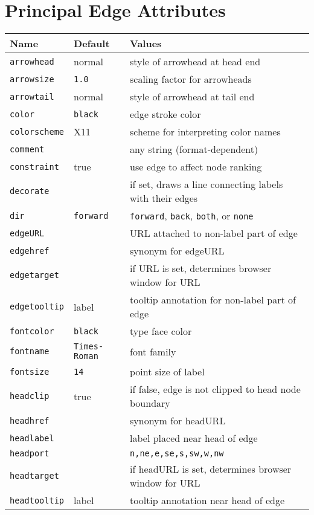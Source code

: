 \documentclass[11pt]{article}
\begin{document}
{\section{Principal Edge Attributes}
\label{sec:edge_attr}
{\footnotesize
\begin{tabular}[t]{|l|l|p{3.5in}|} \hline
Name & Default & Values \\ \hline
{\tt arrowhead} & normal & style of arrowhead at head end \\
{\tt arrowsize} & {\tt 1.0} & scaling factor for arrowheads \\
{\tt arrowtail} & normal & style of arrowhead at tail end \\
{\tt color} & {\tt black} & edge stroke color \\
{\tt colorscheme} & X11 & scheme for interpreting color names \\
{\tt comment} & & any string (format-dependent) \\
{\tt constraint} & true & use edge to affect node ranking \\
{\tt decorate} & & if set, draws a line connecting labels with their edges \\
{\tt dir} & {\tt forward} & {\tt forward}, {\tt back}, {\tt both}, or {\tt none} \\ 
{\tt edgeURL} & & URL attached to non-label part of edge \\
{\tt edgehref} & & synonym for edgeURL \\
{\tt edgetarget} & & if URL is set, determines browser window for URL \\
{\tt edgetooltip} & label & tooltip annotation for non-label part of edge \\
{\tt fontcolor} & {\tt black} & type face color \\
{\tt fontname} & {\tt Times-Roman} & font family \\
{\tt fontsize} & {\tt 14} & point size of label \\
{\tt headclip} & true & if false, edge is not clipped to head node boundary \\
{\tt headhref} & & synonym for headURL \\
{\tt headlabel} & & label placed near head of edge \\
{\tt headport} & & {\tt n,ne,e,se,s,sw,w,nw}\\
{\tt headtarget} & & if headURL is set, determines browser window for URL \\
{\tt headtooltip} & label & tooltip annotation near head of edge \\

\end{tabular}}}
\end{document}
